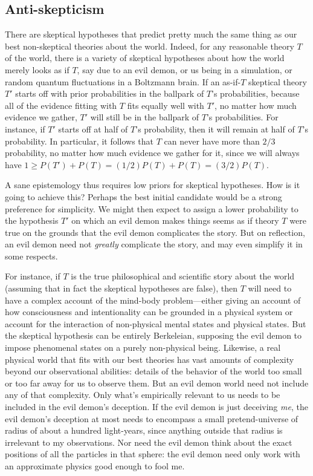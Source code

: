 \subsection{Anti-skepticism}
There are skeptical hypotheses that predict pretty much the same thing as our best non-skeptical theories
about the world. Indeed, for any reasonable theory $T$ of the world, there is a variety of skeptical hypotheses about
how the world merely looks as if $T$, say due to an evil demon, or us being in a simulation, or random quantum 
fluctuations in a Boltzmann brain. If an as-if-$T$ skeptical theory $T'$ starts off with prior probabilities in 
the ballpark of $T$'s probabilities, because all of the evidence fitting with $T$ fits equally well with $T'$, 
no matter how much evidence we gather, $T'$ will still be in the ballpark of $T$'s probabilities. For instance, if
$T'$ starts off at half of $T$'s probability, then it will remain at half of $T$'s probability. In particular, 
it follows that $T$ can never have more than $2/3$ probability, no matter how much evidence we gather for it,
since we will always have $1 \ge P(T')+P(T) = (1/2)P(T)+P(T) = (3/2)P(T)$. 

A sane epistemology thus requires low priors for skeptical hypotheses. How is it going to achieve this?
Perhaps the best initial candidate would be a strong preference for simplicity. We might then expect to assign a lower probability to the hypothesis $T'$ 
on which an evil demon makes things seems as if theory $T$ were true on the grounds that the evil demon complicates 
the story. But on reflection, an evil demon need not \textit{greatly} complicate the story, and may even simplify it 
in some respects.

For instance, if $T$ is the true philosophical and scientific story about the world (assuming that in fact
the skeptical hypotheses are false), then $T$ will need to have a complex account of the mind-body problem---either 
giving an account of how consciousness and intentionality can be grounded in a physical system or account for
the interaction of non-physical mental states and physical states. But the skeptical hypothesis can be entirely
Berkeleian, supposing the evil demon to impose phenomenal states on a purely non-physical being. Likewise, 
a real physical world that fits with our best theories has vast amounts of complexity beyond our observational
abilities: details of the behavior of the world too small or too far away for us to observe them. But an 
evil demon world need not include any of that complexity. Only what's empirically relevant to us needs to be included 
in the evil demon's deception. If the evil demon is just deceiving \textit{me}, the evil demon's deception at most 
needs to encompass a small pretend-universe of radius of about a hundred light-years, since anything outside that radius is
irrelevant to my observations. Nor need the evil demon think about the exact positions of all the particles in that sphere:
the evil demon need only work with an approximate physics good enough to fool me. 

